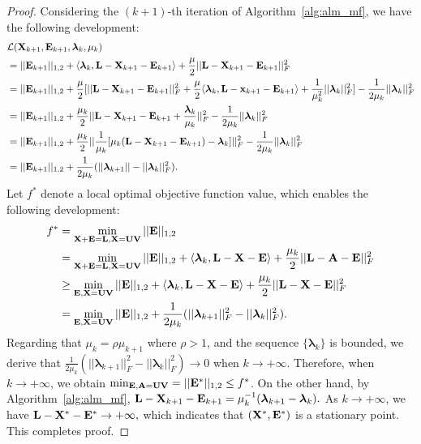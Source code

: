 \documentclass[letterpaper]{article}
\def\bE{{\bf E}}
\def\blambda{{\bm \lambda}}
\def\calL{{\mathcal{L}}}
\def\bL{{\bf L}}
\def\bU{{\bf U}}
\def\bV{{\bf V}}
\def\bX{{\bf X}}
\def\bx{{\bf x}}
\def\bA{{\bf A}}
\def\bx{{\bf x}}
\def\bX{{\bf X}}
\begin{document}
\begin{proof}
    Considering the $(k+1)$-th iteration of Algorithm~\ref{alg:alm_mf}, we have the following development:
    \begin{align}\label{eq:proof1}
      & \calL(\bX_{k+1}, \bE_{k+1}, \blambda_{k}, \mu_{k})   \nonumber \\ 
      & = || \bE_{k+1} ||_{1,2} + \langle \blambda_{k}, \bL - \bX_{k+1} - \bE_{k+1} \rangle + \frac{\mu}{2} || \bL - \bX_{k+1} - \bE_{k+1} ||_{F}^2         \nonumber \\
      & = || \bE_{k+1} ||_{1,2} + \frac{\mu}{2} [ || \bL - \bX_{k+1} - \bE_{k+1} ||_{F}^2 + \frac{\mu}{2} \langle \blambda_{k}, \bL - \bx_{k+1} - \bE_{k+1} \rangle + \frac{1}{\mu_{k}^2} || \blambda_k ||_F^2 ] - \frac{1}{2\mu_k} || \blambda_k ||_F^2    \nonumber  \\
      & = || \bE_{k+1} ||_{1,2} + \frac{\mu_k}{2} || \bL - \bX_{k+1} - \bE_{k+1} + \frac{\blambda_k}{\mu_k} ||_F^2 - \frac{1}{2\mu_k} || \blambda_k ||_F^2   \nonumber \\
      & = || \bE_{k+1} ||_{1,2} + \frac{\mu_k}{2} || \frac{1}{\mu_k} [ \mu_k (\bL - \bX_{k+1} - \bE_{k+1}) - \blambda_k ] ||_F^2 - \frac{1}{2\mu_k} || \blambda_k ||_F^2   \nonumber \\
      & = || \bE_{k+1} ||_{1,2} + \frac{1}{2\mu_k} ( || \blambda_{k+1} || - || \blambda_{k} ||_F^2 )   .
    \end{align}
    \noindent
    Let $f^*$ denote a local optimal objective function value, which enables the following development:
    \begin{align}\label{eq:proof2}
      f^* & = \min_{\bX + \bE = \bL, \bX = \bU \bV} || \bE ||_{1,2}   \nonumber  \\
          & = \min_{\bX + \bE = \bL, \bX = \bU \bV} || \bE ||_{1,2} + \langle \blambda_k, \bL - \bX - \bE \rangle + \frac{\mu_k}{2} || \bL - \bA - \bE ||_F^2   \nonumber \\
          & \geq \min_{\bE, \bX = \bU \bV} || \bE ||_{1,2} + \langle \blambda_k, \bL - \bX - \bE \rangle + \frac{\mu_k}{2} ||  \bL - 
          \bX - \bE ||_F^2     \nonumber \\
          & = \min_{\bE, \bX = \bU \bV} || \bE ||_{1,2} + \frac{1}{2\mu_k} (|| \blambda_{k+1} ||_F^2 - || \blambda_{k} ||_F^2)   .
    \end{align}
    \indent
    Regarding that $\mu_{k} = \rho \mu_{k+1}$ where $\rho > 1$, and the sequence $\{ \blambda_k \}$ is bounded, we derive that
    $\frac{1}{2\mu_k} (|| \blambda_{k+1} ||_F^2 - || \blambda_{k} ||_F^2) \rightarrow 0$ when $k \rightarrow +\infty .$
    Therefore, when $k \rightarrow +\infty$, we obtain $\min_{\bE, \bA = \bU \bV} = || \bE^* ||_{1,2} \leq f^*$.
    On the other hand, by Algorithm~\ref{alg:alm_mf}, $\bL - \bX_{k+1} - \bE_{k+1} = \mu_k^{-1} (\blambda_{k+1} - \blambda_{k}) .$
    As $k \rightarrow +\infty$, we have $\bL - \bX^* - \bE^* \rightarrow +\infty  ,$
    which indicates that $(\bX^*, \bE^*)$ is a stationary point.
    This completes proof.
\end{proof}
\end{document}
